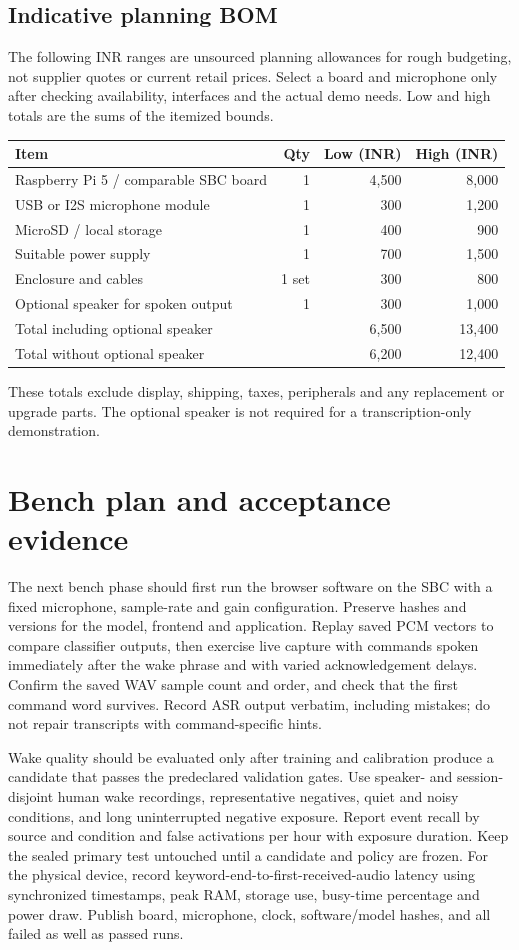 \documentclass[11pt]{article}
\begin{document}
\subsection{Indicative planning BOM}
The following INR ranges are unsourced planning allowances for rough budgeting, not supplier quotes or current retail prices. Select a board and microphone only after checking availability, interfaces and the actual demo needs. Low and high totals are the sums of the itemized bounds.
\begin{center}
\begin{tabularx}{\linewidth}{@{}Y r r r@{}}
\toprule
Item & Qty & Low (INR) & High (INR)\\
\midrule
Raspberry Pi 5 / comparable SBC board & 1 & 4,500 & 8,000\\
USB or I2S microphone module & 1 & 300 & 1,200\\
MicroSD / local storage & 1 & 400 & 900\\
Suitable power supply & 1 & 700 & 1,500\\
Enclosure and cables & 1 set & 300 & 800\\
Optional speaker for spoken output & 1 & 300 & 1,000\\
\midrule
Total including optional speaker & & 6,500 & 13,400\\
Total without optional speaker & & 6,200 & 12,400\\
\bottomrule
\end{tabularx}
\end{center}
These totals exclude display, shipping, taxes, peripherals and any replacement or upgrade parts. The optional speaker is not required for a transcription-only demonstration.
\section{Bench plan and acceptance evidence}
The next bench phase should first run the browser software on the SBC with a fixed microphone, sample-rate and gain configuration. Preserve hashes and versions for the model, frontend and application. Replay saved PCM vectors to compare classifier outputs, then exercise live capture with commands spoken immediately after the wake phrase and with varied acknowledgement delays. Confirm the saved WAV sample count and order, and check that the first command word survives. Record ASR output verbatim, including mistakes; do not repair transcripts with command-specific hints.

Wake quality should be evaluated only after training and calibration produce a candidate that passes the predeclared validation gates. Use speaker- and session-disjoint human wake recordings, representative negatives, quiet and noisy conditions, and long uninterrupted negative exposure. Report event recall by source and condition and false activations per hour with exposure duration. Keep the sealed primary test untouched until a candidate and policy are frozen. For the physical device, record keyword-end-to-first-received-audio latency using synchronized timestamps, peak RAM, storage use, busy-time percentage and power draw. Publish board, microphone, clock, software/model hashes, and all failed as well as passed runs.
\end{document}
